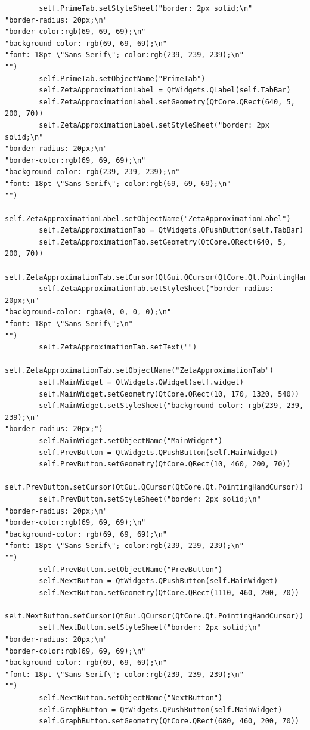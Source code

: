 \documentclass{article}
\begin{document}
\begin{lstlisting}
        self.PrimeTab.setStyleSheet("border: 2px solid;\n"
"border-radius: 20px;\n"
"border-color:rgb(69, 69, 69);\n"
"background-color: rgb(69, 69, 69);\n"
"font: 18pt \"Sans Serif\"; color:rgb(239, 239, 239);\n"
"")
        self.PrimeTab.setObjectName("PrimeTab")
        self.ZetaApproximationLabel = QtWidgets.QLabel(self.TabBar)
        self.ZetaApproximationLabel.setGeometry(QtCore.QRect(640, 5, 200, 70))
        self.ZetaApproximationLabel.setStyleSheet("border: 2px solid;\n"
"border-radius: 20px;\n"
"border-color:rgb(69, 69, 69);\n"
"background-color: rgb(239, 239, 239);\n"
"font: 18pt \"Sans Serif\"; color:rgb(69, 69, 69);\n"
"")
        self.ZetaApproximationLabel.setObjectName("ZetaApproximationLabel")
        self.ZetaApproximationTab = QtWidgets.QPushButton(self.TabBar)
        self.ZetaApproximationTab.setGeometry(QtCore.QRect(640, 5, 200, 70))
        self.ZetaApproximationTab.setCursor(QtGui.QCursor(QtCore.Qt.PointingHandCursor))
        self.ZetaApproximationTab.setStyleSheet("border-radius: 20px;\n"
"background-color: rgba(0, 0, 0, 0);\n"
"font: 18pt \"Sans Serif\";\n"
"")
        self.ZetaApproximationTab.setText("")
        self.ZetaApproximationTab.setObjectName("ZetaApproximationTab")
        self.MainWidget = QtWidgets.QWidget(self.widget)
        self.MainWidget.setGeometry(QtCore.QRect(10, 170, 1320, 540))
        self.MainWidget.setStyleSheet("background-color: rgb(239, 239, 239);\n"
"border-radius: 20px;")
        self.MainWidget.setObjectName("MainWidget")
        self.PrevButton = QtWidgets.QPushButton(self.MainWidget)
        self.PrevButton.setGeometry(QtCore.QRect(10, 460, 200, 70))
        self.PrevButton.setCursor(QtGui.QCursor(QtCore.Qt.PointingHandCursor))
        self.PrevButton.setStyleSheet("border: 2px solid;\n"
"border-radius: 20px;\n"
"border-color:rgb(69, 69, 69);\n"
"background-color: rgb(69, 69, 69);\n"
"font: 18pt \"Sans Serif\"; color:rgb(239, 239, 239);\n"
"")
        self.PrevButton.setObjectName("PrevButton")
        self.NextButton = QtWidgets.QPushButton(self.MainWidget)
        self.NextButton.setGeometry(QtCore.QRect(1110, 460, 200, 70))
        self.NextButton.setCursor(QtGui.QCursor(QtCore.Qt.PointingHandCursor))
        self.NextButton.setStyleSheet("border: 2px solid;\n"
"border-radius: 20px;\n"
"border-color:rgb(69, 69, 69);\n"
"background-color: rgb(69, 69, 69);\n"
"font: 18pt \"Sans Serif\"; color:rgb(239, 239, 239);\n"
"")
        self.NextButton.setObjectName("NextButton")
        self.GraphButton = QtWidgets.QPushButton(self.MainWidget)
        self.GraphButton.setGeometry(QtCore.QRect(680, 460, 200, 70))

\end{lstlisting}
\end{document}
